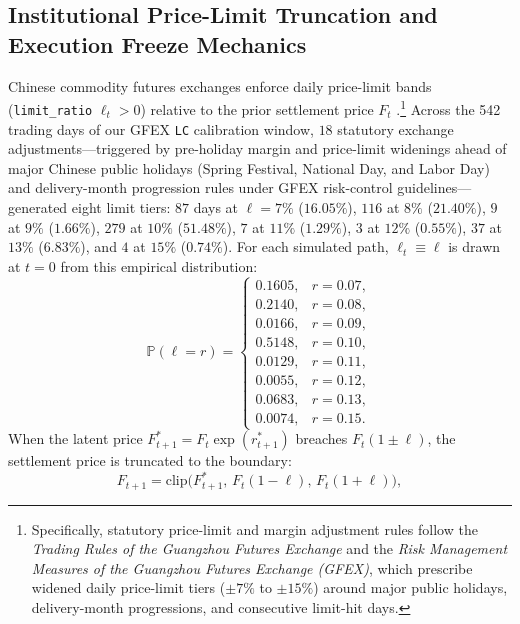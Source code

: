 \documentclass[11pt,a4paper]{article}
\begin{document}
\subsection{Institutional Price-Limit Truncation and Execution Freeze Mechanics}
Chinese commodity futures exchanges enforce daily price-limit bands (\texttt{limit\_ratio} $\ell_t > 0$) relative to the prior settlement price $F_t$ \citep{KimRhee1997,Zhang2023,Xia2024}.\footnote{Specifically, statutory price-limit and margin adjustment rules follow the \emph{Trading Rules of the Guangzhou Futures Exchange} and the \emph{Risk Management Measures of the Guangzhou Futures Exchange (GFEX)}, which prescribe widened daily price-limit tiers ($\pm 7\%$ to $\pm 15\%$) around major public holidays, delivery-month progressions, and consecutive limit-hit days.} Across the 542 trading days of our GFEX \texttt{LC} calibration window, $18$ statutory exchange adjustments---triggered by pre-holiday margin and price-limit widenings ahead of major Chinese public holidays (Spring Festival, National Day, and Labor Day) and delivery-month progression rules under GFEX risk-control guidelines---generated eight limit tiers: $87$ days at $\ell = 7\%$ ($16.05\%$), $116$ at $8\%$ ($21.40\%$), $9$ at $9\%$ ($1.66\%$), $279$ at $10\%$ ($51.48\%$), $7$ at $11\%$ ($1.29\%$), $3$ at $12\%$ ($0.55\%$), $37$ at $13\%$ ($6.83\%$), and $4$ at $15\%$ ($0.74\%$). For each simulated path, $\ell_t \equiv \ell$ is drawn at $t=0$ from this empirical distribution:
\begin{equation}
  \mathbb{P}(\ell = r) = \begin{cases}
  0.1605, & r = 0.07, \\
  0.2140, & r = 0.08, \\
  0.0166, & r = 0.09, \\
  0.5148, & r = 0.10, \\
  0.0129, & r = 0.11, \\
  0.0055, & r = 0.12, \\
  0.0683, & r = 0.13, \\
  0.0074, & r = 0.15.
  \end{cases}
  \label{eq:limit_dist}
\end{equation}
When the latent price $F_{t+1}^* = F_t \exp(r_{t+1}^*)$ breaches $F_t(1 \pm \ell)$, the settlement price is truncated to the boundary:
\begin{equation}
  F_{t+1} = \text{clip}\big(F_{t+1}^*,\, F_t(1 - \ell),\, F_t(1 + \ell)\big),
  \label{eq:price_clip}
\end{equation}
\end{document}
